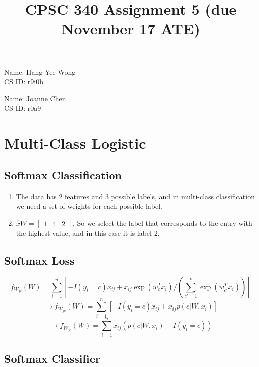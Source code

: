 \documentclass{article}
\def\enum#1{\begin{enumerate}#1\end{enumerate}}
\begin{document}
\title{CPSC 340 Assignment 5 (due November 17 ATE)}
\author{}
\date{}
\maketitle
\vspace{-4em}

Name: Hang Yee Wong\\
CS ID: r9i0b

Name: Joanne Chen\\
CS ID: r0a9

\section{Multi-Class Logistic}

\subsection{Softmax Classification}

\enum{
\item The data has 2 features and 3 possible labels, and in multi-class classification we need a set of weights for each possible label.
\item $\hat{x} W =
\begin{bmatrix}
1 & 4 & 2
\end{bmatrix}$. So we select the label that corresponds to the entry with the highest value, and in this case it is label 2.
}

\subsection{Softmax Loss}

$$f_{W_{jc}}(W) = \sum_{i=1}^n \left[-I(y_i = c)x_{ij} + x_{ij}\exp(w_c^Tx_i)/\left(\sum_{c' = 1}^k \exp(w_{c'}^Tx_i)\right)\right]$$
$$\to f_{W_{jc}}(W) = \sum_{i=1}^n \left[-I(y_i = c)x_{ij} + x_{ij}p(c|W,x_i)\right]$$
$$\to f_{W_{jc}}(W) = \sum_{i=1}^n x_{ij}(p(c|W,x_i)-I(y_i = c))$$


\subsection{Softmax Classifier}
\end{document}
